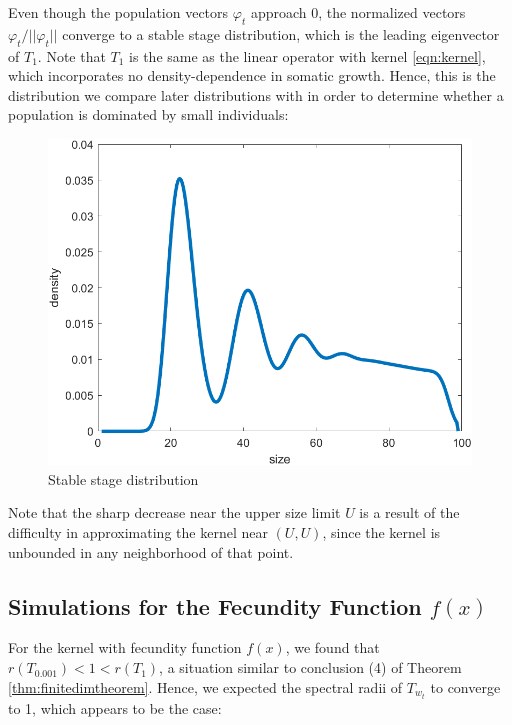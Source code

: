 Even though the population vectors $\varphi_t$ approach 0, the normalized vectors $\varphi_t / || \varphi_t||$ converge to a stable stage distribution, which is the leading eigenvector of $T_1$. Note that $T_1$ is the same as the linear operator with kernel \ref{eqn:kernel}, which incorporates no density-dependence in somatic growth. Hence, this is the distribution we compare later distributions with in order to determine whether a population is dominated by small individuals:

\begin{figure}[H]
	\centering
	\includegraphics[width=0.7\linewidth]{Images/F=0.05/ssd_when_f=0.05}
	\caption{Stable stage distribution}
	\label{fig:ssdwhenf=0.05}
\end{figure}

Note that the sharp decrease near the upper size limit $U$ is a result of the difficulty in approximating the kernel near $(U,U)$, since the kernel is unbounded in any neighborhood of that point.

\subsection{Simulations for the Fecundity Function $f(x)$} \label{subsec:f(x)}

For the kernel with fecundity function $f(x)$, we found that $r(T_{0.001}) < 1 < r(T_1)$, a situation similar to conclusion (4) of Theorem \ref{thm:finitedimtheorem}. Hence, we expected the spectral radii of $T_{w_t}$ to converge to 1, which appears to be the case:

